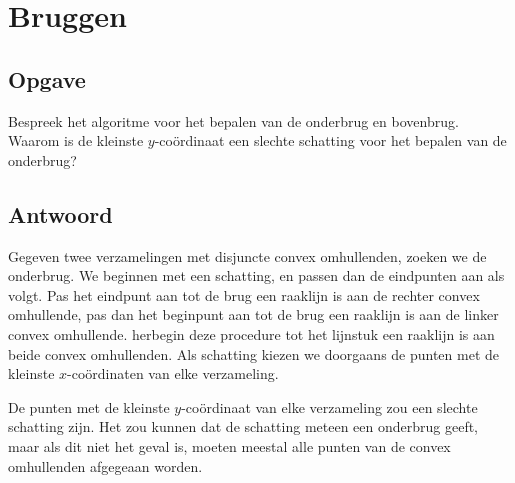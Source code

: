 \documentclass[examenvragen.tex]{subfiles}
\begin{document}
\section{Bruggen}
\subsection{Opgave}
Bespreek het algoritme voor het bepalen van de onderbrug en bovenbrug. Waarom is de kleinste $y$-co\"ordinaat een slechte schatting voor het bepalen van de onderbrug?

\subsection{Antwoord}
Gegeven twee verzamelingen met disjuncte convex omhullenden, zoeken we de onderbrug. We beginnen met een schatting, en passen dan de eindpunten aan als volgt. Pas het eindpunt aan tot de brug een raaklijn is aan de rechter convex omhullende, pas dan het beginpunt aan tot de brug een raaklijn is aan de linker convex omhullende. herbegin deze procedure tot het lijnstuk een raaklijn is aan beide convex omhullenden. Als schatting kiezen we doorgaans de punten met de kleinste $x$-co\"ordinaten van elke verzameling.

De punten met de kleinste $y$-co\"ordinaat van elke verzameling zou een slechte schatting zijn. Het zou kunnen dat de schatting meteen een onderbrug geeft, maar als dit niet het geval is, moeten meestal alle punten van de convex omhullenden afgegeaan worden.
\end{document}
